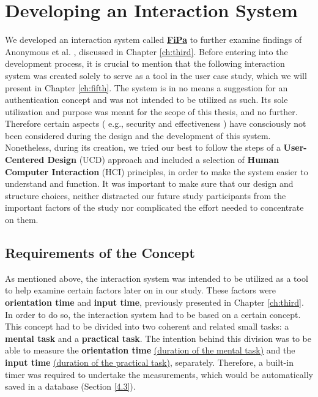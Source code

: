 
\chapter{Developing an Interaction System}\label{ch:forth}
We developed an interaction system called \underline{\textbf{FiPa}} to further examine findings of Anonymous et al. \cite{anonymous}, discussed in Chapter \ref{ch:third}. Before entering into the development process, it is crucial to mention that the following interaction system was created solely to serve as a tool in the user case study, which we will present in Chapter \ref{ch:fifth}. The system is in no means a suggestion for an authentication concept and was not intended to be utilized as such. Its sole utilization and purpose was meant for the scope of this thesis, and no further. Therefore certain aspects ( e.g., security and effectiveness ) have consciously not been considered during the design and the development of this system. Nonetheless, during its creation, we tried our best to follow the steps of a \textbf{User-Centered Design} (UCD) approach and included a selection of \textbf{Human Computer Interaction} (HCI) principles, in order to make the system easier to understand and function. It was important to make sure that our design and structure choices, neither distracted our future study participants from the important factors of the study nor complicated the effort needed to concentrate on them.  


\section{Requirements of the Concept} \label{4.1}
As mentioned above, the interaction system was intended to be utilized as a tool to help examine certain factors later on in our study. These factors were \textbf{orientation time} and \textbf{input time}, previously presented in Chapter \ref{ch:third}. In order to do so, the interaction system had to be based on a certain concept. This concept had to be divided into two coherent and related small tasks: a \textbf{mental task} and a \textbf{practical task}. The intention behind this division was to be able to measure the \textbf{orientation time} \underline{(duration of the mental task)} and the \textbf{input time} \underline{(duration of the practical task)}, separately. Therefore, a built-in timer was required to undertake the measurements, which would be automatically saved in a database (Section \ref{4.3}).\\

